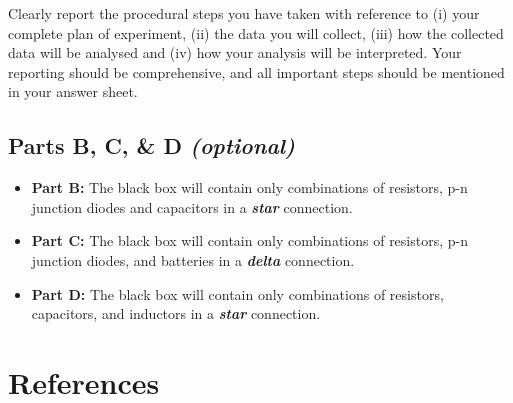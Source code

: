 \begin{imp}
Clearly report the procedural steps you have taken with reference to (i) your complete plan of experiment, (ii) the data you will collect, (iii) how the collected data will be analysed and (iv) how your analysis will be interpreted. Your reporting should be comprehensive, and all important steps should be mentioned in your answer sheet.
\end{imp}

\subsection*{Parts B, C, \& D \textit{(optional)}}

\begin{itemize}
    \item \textbf{Part B:} The black box will contain only combinations of resistors, p-n junction diodes and capacitors in a \textit{\textbf{star}} connection. 
    
    \item \textbf{Part C:} The black box will contain only combinations of resistors, p-n junction diodes, and batteries in a \textit{\textbf{delta}} connection. 
    
    \item \textbf{Part D:} The black box will contain only combinations of  resistors, capacitors, and inductors in a \textit{\textbf{star}} connection.
\end{itemize}




\section*{References}

